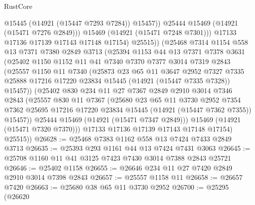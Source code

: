 \begin{lexlean}{RustCore}
\begin{coremodule}
                    @15445
                    (@14921 (@15447 @7293 @7284))
                    @15457))
                @25444
                @15469
                (@14921 (@15471 @7276 @2849)))
              @15469
              (@14921 (@15471 @7248 @7301)))
            @17133
            @17136
            @17139
            @17143
            @17148
            @17154)
          @25515))
      (@25468
        @7314
        @1154
        @558
        @13
        @7371
        @7380
        @2849
        @3713
        (@25394
          @1153
          @44
          @13
          @7371
          @7378
          @3631
          (@25402
            @1150
            @1152
            @11
            @41
            @7340
            @7370
            @7377
            @3014
            @7319
            @2843
            (@25557
              @1150
              @11
              @7340
              (@25873
                @23
                @65
                @11
                @3647
                @2952
                @7327
                @7335
                @25888
                @17216
                @17220
                @23834
                @15445
                (@14921 (@15447 @7335 @7328))
                @15457))
            (@25402
              @830
              @234
              @11
              @27
              @7367
              @2849
              @2910
              @3014
              @7346
              @2843
              (@25557
                @830
                @11
                @7367
                (@25680
                  @23
                  @65
                  @11
                  @3730
                  @2952
                  @7354
                  @7362
                  @25695
                  @17216
                  @17220
                  @23834
                  @15445
                  (@14921 (@15447 @7362 @7355))
                  @15457))
              @25444
              @15469
              (@14921 (@15471 @7347 @2849)))
            @15469
            (@14921 (@15471 @7320 @7370)))
          @17133
          @17136
          @17139
          @17143
          @17148
          @17154)
        @25515))
@26628 := @25468 @7383 @1162 @558 @13 @7424 @7433 @2849 @3713
@26635 := @25393 @293 @1161 @44 @13 @7424 @7431 @3063
@26645 := @25708 @1160 @11 @41 @3125 @7423 @7430 @3014 @7388 @2843 @25721
@26646 := @25402 @1158
@26655 := @26646 @234 @11 @27 @7420 @2849 @2910 @3014 @7398 @2843
@26657 := @25557 @1158 @11
@26658 := @26657 @7420
@26663 := @25680 @38 @65 @11 @3730 @2952
@26700 := @25295
    (@26620

\end{coremodule}
\end{lexlean}
